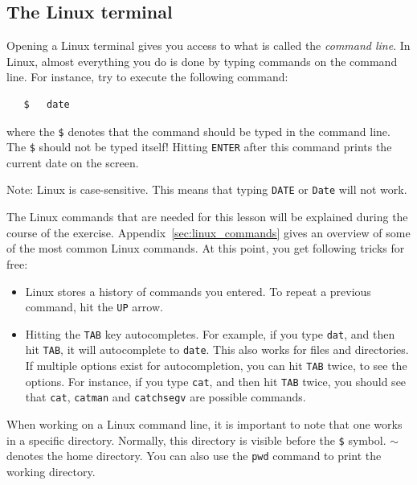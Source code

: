 \documentclass[a4paper]{article}
\begin{document}
\subsection{The Linux terminal}
%
\par
Opening a Linux terminal gives you access to what is called the \emph{command line}. In Linux, almost everything you do is done by typing commands on the command line. For instance, try to execute the following command:
%
\begin{verbatim}
   $   date
\end{verbatim}
%
where the \texttt{\$} denotes that the command should be typed in the command line. The \texttt{\$} should not be typed itself! Hitting \texttt{ENTER} after this command prints the current date on the screen.
%
\par
Note: Linux is case-sensitive. This means that typing \verb+DATE+ or \verb+Date+ will not work.
%
\par
The Linux commands that are needed for this lesson will be explained during the course of the exercise. Appendix~\ref{sec:linux_commands} gives an overview of some of the most common Linux commands. At this point, you get following tricks for free:
%
\begin{itemize}
	\item Linux stores a history of commands you entered. To repeat a previous command, hit the \texttt{UP} arrow.
	\item Hitting the \texttt{TAB} key autocompletes. For example, if you type \texttt{dat}, and then hit \texttt{TAB}, it will autocomplete to \texttt{date}. This also works for files and directories. If multiple options exist for autocompletion, you can hit \texttt{TAB} twice, to see the options. For instance, if you type \texttt{cat}, and then hit \texttt{TAB} twice, you should see that \texttt{cat}, \texttt{catman} and \texttt{catchsegv} are possible commands.
\end{itemize}
%
\par
When working on a Linux command line, it is important to note that one works in a specific directory. Normally, this directory is visible before the \texttt{\$} symbol. $\sim$ denotes the home directory. You can also use the \verb+pwd+ command to print the working directory.
%
\end{document}
